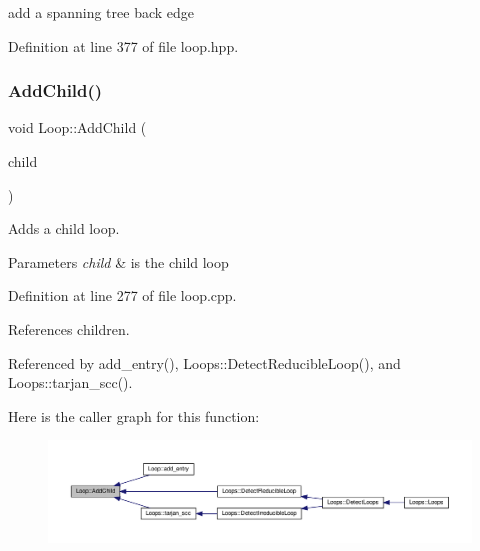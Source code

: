 add a spanning tree back edge 



Definition at line 377 of file loop.\+hpp.

\mbox{\label{classLoop_a99c31028564545c39746c258e8ffbee7}} 
\subsubsection{\texorpdfstring{Add\+Child()}{AddChild()}}
{\footnotesize\ttfamily void Loop\+::\+Add\+Child (\begin{DoxyParamCaption}\item[{\hyperlink{loop_8hpp_aa4a60313089619376f67557c4120423c}{Loop\+Ref}}]{child }\end{DoxyParamCaption})}



Adds a child loop. 


\begin{DoxyParams}{Parameters}
{\em child} & is the child loop \\
\hline
\end{DoxyParams}


Definition at line 277 of file loop.\+cpp.



References children.



Referenced by add\+\_\+entry(), Loops\+::\+Detect\+Reducible\+Loop(), and Loops\+::tarjan\+\_\+scc().

Here is the caller graph for this function\+:
\nopagebreak
\begin{figure}[H]
\begin{center}
\leavevmode
\includegraphics[width=350pt]{de/d77/classLoop_a99c31028564545c39746c258e8ffbee7_icgraph}
\end{center}
\end{figure}
\mbox{\label{classLoop_a32029bfa844485ff802cb03e18052142}} 
